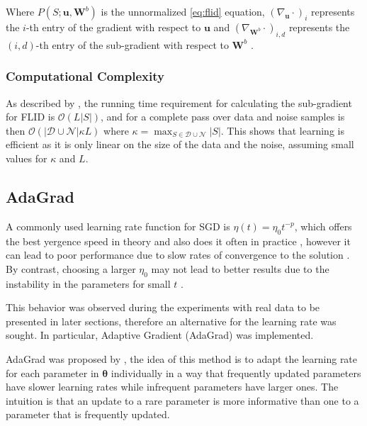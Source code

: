 Where $P(S;\mathbf{u}, \mathbf{W}^{b})$ is the unnormalized \eqref{eq:flid} equation, $\left(\nabla_{\mathbf{u}}\cdot \right)_{i}$ represents the $i$-th entry of the gradient with respect to $\mathbf{u}$ and $\left(\nabla_{\mathbf{W}^{b}}\cdot\right)_{i,d}$ represents the $(i,d)$-th entry of the sub-gradient with respect to $\mathbf{W}^{b}$ \citep{tschiatschek16learning}.

\subsubsection{Computational Complexity}

As described by \citet{tschiatschek16learning}, the running time requirement for calculating the sub-gradient for FLID is $\mathcal{O}(L|S|)$, and for a complete pass over data and noise samples is then $\mathcal{O}(|\mathcal{D}\cup\mathcal{N}|\kappa L)$ where $\kappa = \max_{S \in \mathcal{D}\cup\mathcal{N}}{|S|}$. This shows that learning is efficient as it is only linear on the size of the data and the noise, assuming small values for $\kappa$ and $L$.

\subsection{AdaGrad}
\label{sec:adagrad}

A commonly used learning rate function for SGD is $\eta(t) = \eta_{0}t^{-p}$, which offers the best yergence speed in theory and also does it often in practice \citep{bottou2012stochastic}, however it can lead to poor performance due to slow rates of convergence to the solution \citep{darken1992towards}. By contrast, choosing a larger $\eta_{0}$ may not lead to better results due to the instability in the parameters for small $t$ \citep{Darken1990}. 

This behavior was observed during the experiments with real data to be presented in later sections, therefore an alternative for the learning rate was sought. In particular, Adaptive Gradient (AdaGrad) was implemented.

AdaGrad was proposed by \citet{Duchi2011adagrad}, the idea of this method is to adapt the learning rate for each parameter in $\boldsymbol{\theta}$ individually in a way that frequently updated parameters have slower learning rates while infrequent parameters have larger ones. The intuition is that an update to a rare parameter is more informative than one to a parameter that is frequently updated.

